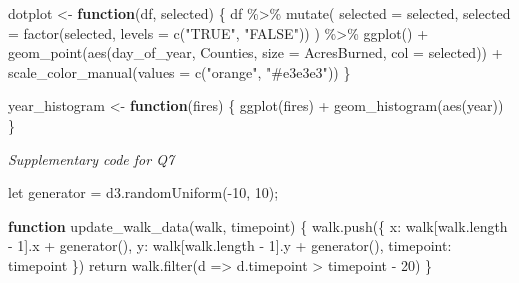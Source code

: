 \documentclass[
]{article}
\newenvironment{Shaded}{\begin{snugshade}}{\end{snugshade}}
\newcommand{\AttributeTok}[1]{\textcolor[rgb]{0.77,0.63,0.00}{#1}}
\newcommand{\ControlFlowTok}[1]{\textcolor[rgb]{0.13,0.29,0.53}{\textbf{#1}}}
\newcommand{\DecValTok}[1]{\textcolor[rgb]{0.00,0.00,0.81}{#1}}
\newcommand{\FunctionTok}[1]{\textcolor[rgb]{0.00,0.00,0.00}{#1}}
\newcommand{\NormalTok}[1]{#1}
\newcommand{\OtherTok}[1]{\textcolor[rgb]{0.56,0.35,0.01}{#1}}
\newcommand{\SpecialCharTok}[1]{\textcolor[rgb]{0.00,0.00,0.00}{#1}}
\newcommand{\StringTok}[1]{\textcolor[rgb]{0.31,0.60,0.02}{#1}}
\begin{document}
\begin{Shaded}
\begin{Highlighting}[]
\NormalTok{dotplot }\OtherTok{\textless{}{-}} \ControlFlowTok{function}\NormalTok{(df, selected) \{}
\NormalTok{  df }\SpecialCharTok{\%\textgreater{}\%}
    \FunctionTok{mutate}\NormalTok{(}
      \AttributeTok{selected =}\NormalTok{ selected,}
      \AttributeTok{selected =} \FunctionTok{factor}\NormalTok{(selected, }\AttributeTok{levels =} \FunctionTok{c}\NormalTok{(}\StringTok{"TRUE"}\NormalTok{, }\StringTok{"FALSE"}\NormalTok{))}
\NormalTok{      ) }\SpecialCharTok{\%\textgreater{}\%}
  \FunctionTok{ggplot}\NormalTok{() }\SpecialCharTok{+}
    \FunctionTok{geom\_point}\NormalTok{(}\FunctionTok{aes}\NormalTok{(day\_of\_year, Counties, }\AttributeTok{size =}\NormalTok{ AcresBurned, }\AttributeTok{col =}\NormalTok{ selected)) }\SpecialCharTok{+}
    \FunctionTok{scale\_color\_manual}\NormalTok{(}\AttributeTok{values =} \FunctionTok{c}\NormalTok{(}\StringTok{"orange"}\NormalTok{, }\StringTok{"\#e3e3e3"}\NormalTok{))}
\NormalTok{\}}
  
\NormalTok{year\_histogram }\OtherTok{\textless{}{-}} \ControlFlowTok{function}\NormalTok{(fires) \{}
  \FunctionTok{ggplot}\NormalTok{(fires) }\SpecialCharTok{+}
    \FunctionTok{geom\_histogram}\NormalTok{(}\FunctionTok{aes}\NormalTok{(year))}
\NormalTok{\}}
\end{Highlighting}
\end{Shaded}

\emph{Supplementary code for Q7}

\begin{Shaded}
\begin{Highlighting}[]
\NormalTok{let  generator }\OtherTok{=} \FunctionTok{d3.randomUniform}\NormalTok{(}\SpecialCharTok{{-}}\DecValTok{10}\NormalTok{, }\DecValTok{10}\NormalTok{);}

\ControlFlowTok{function} \FunctionTok{update\_walk\_data}\NormalTok{(walk, timepoint) \{}
  \FunctionTok{walk.push}\NormalTok{(\{}
\NormalTok{    x}\SpecialCharTok{:}\NormalTok{ walk[walk.length }\SpecialCharTok{{-}} \DecValTok{1}\NormalTok{].x }\SpecialCharTok{+} \FunctionTok{generator}\NormalTok{(),}
\NormalTok{    y}\SpecialCharTok{:}\NormalTok{ walk[walk.length }\SpecialCharTok{{-}} \DecValTok{1}\NormalTok{].y }\SpecialCharTok{+} \FunctionTok{generator}\NormalTok{(),}
\NormalTok{    timepoint}\SpecialCharTok{:}\NormalTok{ timepoint}
\NormalTok{  \})}
\NormalTok{  return }\FunctionTok{walk.filter}\NormalTok{(}\AttributeTok{d =}\SpecialCharTok{\textgreater{}}\NormalTok{ d.timepoint }\SpecialCharTok{\textgreater{}}\NormalTok{ timepoint }\SpecialCharTok{{-}} \DecValTok{20}\NormalTok{)}
\NormalTok{\}}
\end{Highlighting}
\end{Shaded}
\end{document}
